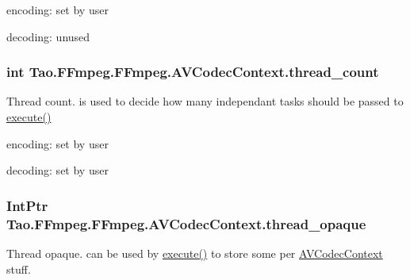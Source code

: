 \begin{DoxyItemize}
\item encoding: set by user
\item decoding: unused 
\end{DoxyItemize}\hypertarget{struct_tao_1_1_f_fmpeg_1_1_f_fmpeg_1_1_a_v_codec_context_a73ba3575babb9cd5543c81530a3085af}{
\subsubsection[{thread\_\-count}]{\setlength{\rightskip}{0pt plus 5cm}int {\bf Tao.FFmpeg.FFmpeg.AVCodecContext.thread\_\-count}}}
\label{struct_tao_1_1_f_fmpeg_1_1_f_fmpeg_1_1_a_v_codec_context_a73ba3575babb9cd5543c81530a3085af}
Thread count. is used to decide how many independant tasks should be passed to \hyperlink{struct_tao_1_1_f_fmpeg_1_1_f_fmpeg_1_1_a_v_codec_context_a715241b68abafe3d68f967b13e514bec}{execute()}
\begin{DoxyItemize}
\item encoding: set by user
\item decoding: set by user 
\end{DoxyItemize}\hypertarget{struct_tao_1_1_f_fmpeg_1_1_f_fmpeg_1_1_a_v_codec_context_a68282e79583391c677104895769a5251}{
\subsubsection[{thread\_\-opaque}]{\setlength{\rightskip}{0pt plus 5cm}IntPtr {\bf Tao.FFmpeg.FFmpeg.AVCodecContext.thread\_\-opaque}}}
\label{struct_tao_1_1_f_fmpeg_1_1_f_fmpeg_1_1_a_v_codec_context_a68282e79583391c677104895769a5251}
Thread opaque. can be used by \hyperlink{struct_tao_1_1_f_fmpeg_1_1_f_fmpeg_1_1_a_v_codec_context_a715241b68abafe3d68f967b13e514bec}{execute()} to store some per \hyperlink{struct_tao_1_1_f_fmpeg_1_1_f_fmpeg_1_1_a_v_codec_context}{AVCodecContext} stuff.
